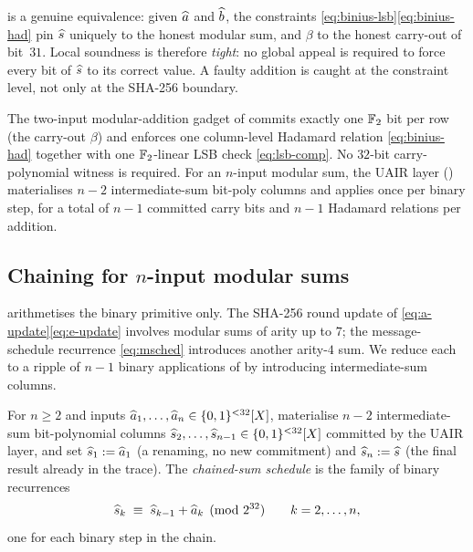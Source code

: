 \begin{remark}\label{rem:bin-soundness}
 is a genuine equivalence: given $\widehat{a}$ and
$\widehat{b}$, the constraints \eqref{eq:binius-lsb}\eqref{eq:binius-had}
pin $\widehat{s}$ uniquely to the honest modular sum, and $\beta$ to the
honest carry-out of bit~$31$. Local soundness is therefore
\emph{tight}: no global appeal is required to force every bit of
$\widehat{s}$ to its correct value. A faulty addition is caught at the
constraint level, not only at the SHA-256 boundary.
\end{remark}

\begin{proposition}\label{prop:binius-count}
The two-input modular-addition gadget of  commits
exactly one $\mathbb{F}_2$ bit per row (the carry-out $\beta$) and enforces
one column-level Hadamard relation \eqref{eq:binius-had} together
with one $\mathbb{F}_2$-linear LSB check \eqref{eq:lsb-comp}. No $32$-bit
carry-polynomial witness is required. For an $n$-input modular sum,
the UAIR layer () materialises $n - 2$
intermediate-sum bit-poly columns and applies 
once per binary step, for a total of $n - 1$ committed carry bits and
$n - 1$ Hadamard relations per addition.
\end{proposition}

\subsection{Chaining for $n$-input modular sums}\label{sec:mod-add-chain}

 arithmetises the binary primitive only. The
SHA-256 round update of \eqref{eq:a-update}\eqref{eq:e-update} involves
modular sums of arity up to $7$; the message-schedule recurrence
\eqref{eq:msched} introduces another arity-$4$ sum. We reduce each to
a ripple of $n - 1$ binary applications of  by
introducing intermediate-sum columns.

\begin{definition}\label{def:chain}
For $n \geq 2$ and inputs $\widehat{a}_1, \dots, \widehat{a}_n \in \{0,1\}^{<32}[X]$,
materialise $n - 2$ intermediate-sum bit-polynomial columns
$\widehat{s}_2, \dots, \widehat{s}_{n-1} \in \{0,1\}^{<32}[X]$ committed by the UAIR
layer, and set $\widehat{s}_1 := \widehat{a}_1$ (a renaming, no new commitment)
and $\widehat{s}_n := \widehat{s}$ (the final result already in the trace). The
\emph{chained-sum schedule} is the family of binary recurrences
\begin{equation}\label{eq:bin-chain}
\widehat{s}_k \;\equiv\; \widehat{s}_{k-1} + \widehat{a}_k \pmod{2^{32}}
\qquad k = 2, \dots, n,
\end{equation}
one for each binary step in the chain.
\end{definition}

